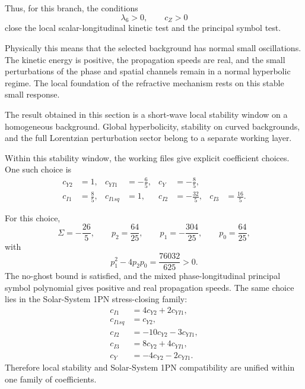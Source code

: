 \documentclass[12pt]{article}
\begin{document}
Thus, for this branch, the conditions
\begin{equation}
\lambda_6>0,\qquad c_Z>0
\end{equation}
close the local scalar-longitudinal kinetic test and the principal symbol test.

Physically this means that the selected background has normal small oscillations. The kinetic energy is positive, the propagation speeds are real, and the small perturbations of the phase and spatial channels remain in a normal hyperbolic regime. The local foundation of the refractive mechanism rests on this stable small response.

The result obtained in this section is a short-wave local stability window on a homogeneous background. Global hyperbolicity, stability on curved backgrounds, and the full Lorentzian perturbation sector belong to a separate working layer.

Within this stability window, the working files give explicit coefficient choices. One such choice is
\begin{align}
c_{Y2}&=1,&
c_{YI1}&=-\frac65,&
c_Y&=-\frac85,\\
c_{I1}&=\frac85,&
c_{I1sq}&=1,&
c_{I2}&=-\frac{32}{5},&
c_{I3}&=\frac{16}{5}.
\end{align}

For this choice,
\begin{equation}
\Sigma=-\frac{26}{5},\qquad
p_2=\frac{64}{25},\qquad
p_1=-\frac{304}{25},\qquad
p_0=\frac{64}{25},
\end{equation}
with
\begin{equation}
p_1^2-4p_2p_0=\frac{76032}{625}>0 .
\end{equation}
The no-ghost bound is satisfied, and the mixed phase-longitudinal principal symbol polynomial gives positive and real propagation speeds. The same choice lies in the Solar-System 1PN stress-closing family:
\begin{align}
c_{I1} &= 4c_{Y2}+2c_{YI1}, \\
c_{I1sq} &= c_{Y2}, \\
c_{I2} &= -10c_{Y2}-3c_{YI1}, \\
c_{I3} &= 8c_{Y2}+4c_{YI1}, \\
c_Y &= -4c_{Y2}-2c_{YI1}.
\end{align}
Therefore local stability and Solar-System 1PN compatibility are unified within one family of coefficients.
\end{document}
